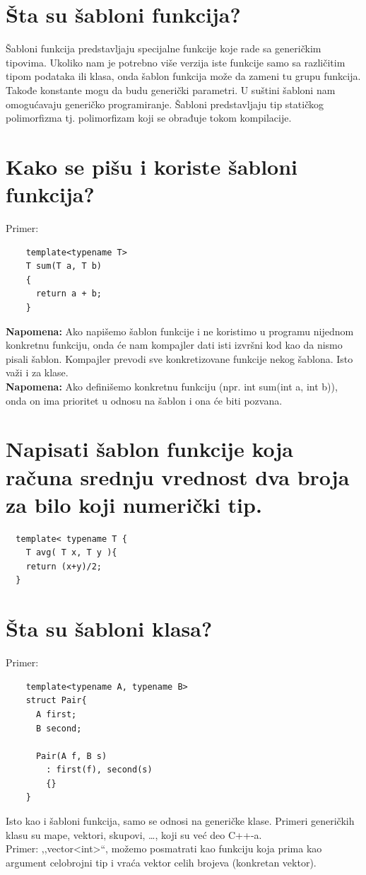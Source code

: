 \documentclass[a4paper]{article}
\begin{document}
\section{Šta su šabloni funkcija?}
    Šabloni funkcija predstavljaju specijalne funkcije koje rade sa generičkim tipovima. 
    Ukoliko nam je potrebno više verzija iste funkcije samo sa različitim tipom podataka ili klasa, 
    onda šablon funkcija može da zameni tu grupu funkcija. Takođe konstante mogu da budu generički 
    parametri. U suštini šabloni nam omogućavaju generičko programiranje. Šabloni predstavljaju tip 
    statičkog polimorfizma tj. polimorfizam koji se obrađuje tokom kompilacije.\cite{cppref_templates}

\section{Kako se pišu i koriste šabloni funkcija?}
  \noindent Primer:
  \begin{lstlisting}
    template<typename T> 
    T sum(T a, T b)
    {
      return a + b;
    }\end{lstlisting}
  \textbf{Napomena:} Ako napišemo šablon funkcije i ne koristimo u programu nijednom konkretnu funkciju,
  onda će nam kompajler dati isti izvršni kod kao da nismo pisali šablon. Kompajler prevodi 
  sve konkretizovane funkcije nekog šablona. Isto važi i za klase. \\
  \textbf{Napomena:} Ako definišemo konkretnu funkciju (npr. int sum(int a, int b)), onda on ima 
  prioritet u odnosu na šablon i ona će biti pozvana.

\section{Napisati šablon funkcije koja računa srednju vrednost dva broja za bilo koji numerički tip.}
\begin{lstlisting}
  template< typename T {
    T avg( T x, T y ){
    return (x+y)/2;
  }\end{lstlisting}

\section{Šta su šabloni klasa?}
  \noindent Primer:
  \begin{lstlisting}
    template<typename A, typename B>
    struct Pair{
      A first;
      B second;
    
      Pair(A f, B s)
        : first(f), second(s)
        {}
    }\end{lstlisting}
  Isto kao i šabloni funkcija, samo se odnosi na generičke klase. Primeri generičkih klasu su mape, 
  vektori, skupovi, \dots, koji su već deo C++-a. \\
  \indent Primer: ,,vector<int>``, možemo posmatrati kao funkciju 
  koja prima kao argument celobrojni tip i vraća vektor celih brojeva (konkretan vektor).
\end{document}
